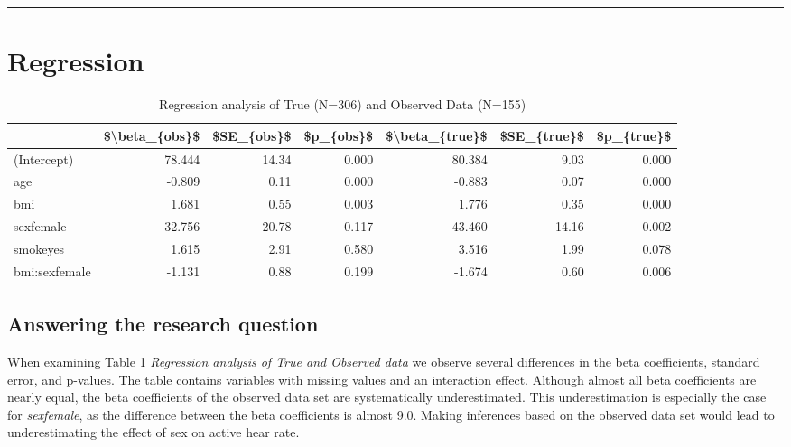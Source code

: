\documentclass[
]{article}
\begin{document}
\begin{center}\rule{0.5\linewidth}{0.5pt}\end{center}

\hypertarget{data4}{%
\section{Regression}\label{data4}}

\begin{table}

\caption{\label{tab:reg}Regression analysis of True (N=306) and Observed Data (N=155)}
\centering
\begin{tabular}[t]{l|r|r|r|r|r|r}
\hline
  & \$\textbackslash{}beta\_\{obs\}\$ & \$SE\_\{obs\}\$ & \$p\_\{obs\}\$ & \$\textbackslash{}beta\_\{true\}\$ & \$SE\_\{true\}\$ & \$p\_\{true\}\$\\
\hline
(Intercept) & 78.444 & 14.34 & 0.000 & 80.384 & 9.03 & 0.000\\
\hline
age & -0.809 & 0.11 & 0.000 & -0.883 & 0.07 & 0.000\\
\hline
bmi & 1.681 & 0.55 & 0.003 & 1.776 & 0.35 & 0.000\\
\hline
sexfemale & 32.756 & 20.78 & 0.117 & 43.460 & 14.16 & 0.002\\
\hline
smokeyes & 1.615 & 2.91 & 0.580 & 3.516 & 1.99 & 0.078\\
\hline
bmi:sexfemale & -1.131 & 0.88 & 0.199 & -1.674 & 0.60 & 0.006\\
\hline
\end{tabular}
\end{table}

\hypertarget{answering-the-research-question}{%
\subsection{Answering the research question}\label{answering-the-research-question}}

When examining Table \ref{tab:reg} \emph{Regression analysis of True and Observed data} we observe several differences in the beta coefficients, standard error, and p-values. The table contains variables with missing values and an interaction effect. Although almost all beta coefficients are nearly equal, the beta coefficients of the observed data set are systematically underestimated. This underestimation is especially the case for \emph{sexfemale}, as the difference between the beta coefficients is almost 9.0. Making inferences based on the observed data set would lead to underestimating the effect of sex on active hear rate.
\end{document}
